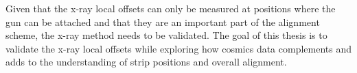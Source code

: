 Given that the x-ray local offsets can only be measured at positions where the gun can be attached and that they are an important part of the alignment scheme, the x-ray method needs to be validated. The goal of this thesis is to validate the x-ray local offsets while exploring how cosmics data complements and adds to the understanding of strip positions and overall alignment.




